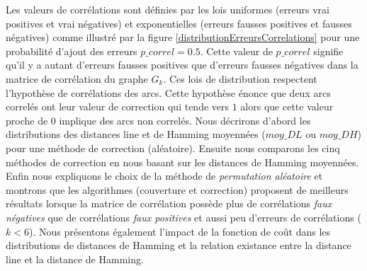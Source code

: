Les valeurs de corr\'elations sont d\'efinies par les lois uniformes (erreurs vrai positives et vrai n\'egatives) et exponentielles (erreurs fausses positives et fausses n\'egatives) comme illustr\'e par la figure \ref{distributionErreursCorrelations} pour une probabilit\'e d'ajout des erreurs $p\_correl = 0.5$. 
Cette valeur de $p\_correl$  signifie qu'il y a autant d'erreurs fausses positives que d'erreurs fausses n\'egatives dans la matrice de corr\'elation du graphe $G_{k}$. 
Ces lois de distribution respectent l'hypoth\`ese de corr\'elations des arcs. Cette hypoth\`ese \'enonce que deux arcs correl\'es ont leur valeur de correction qui tende vers $1$ alors que cette valeur proche de $0$ implique des arcs non correl\'es. 
\newline
Nous d\'ecrirons d'abord les distributions des distances line et de Hamming moyenn\'ees ($moy\_DL$ ou $moy\_DH$) pour une m\'ethode de correction (al\'eatoire). Ensuite nous comparons les cinq m\'ethodes de correction en nous basant sur les distances de Hamming moyenn\'ees. 
Enfin nous expliquons le choix de la m\'ethode de {\em permutation al\'eatoire} et montrons que les algorithmes (couverture et correction) proposent de meilleurs r\'esultats lorsque la matrice de corr\'elation poss\`ede plus de corr\'elations {\em faux n\'egatives} que de corr\'elations {\em faux positives} et aussi peu d'erreurs de corr\'elations ($k < 6$). 
\newline
Nous pr\'esentons \'egalement l'impact de la fonction de co\^ut dans les distributions  de distances de Hamming et 
la relation existance entre la distance line et la distance de Hamming.